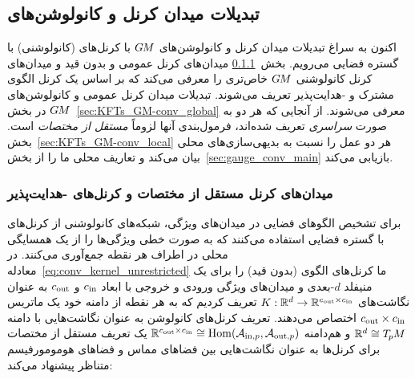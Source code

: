 

\subsection{تبدیلات میدان کرنل و کانولوشن‌های }
\label{sec:global_conv}

اکنون به سراغ تبدیلات میدان کرنل و کانولوشن‌های $G\mkern-1.4muM$ با کرنل‌های (کانولوشنی) با گستره فضایی می‌رویم.
بخش~\ref{sec:kernel_fields} میدان‌های کرنل عمومی و بدون قید و میدان‌های کرنل کانولوشنی $G\mkern-1.4muM$ خاص‌تری را معرفی می‌کند که بر اساس یک کرنل الگوی مشترک و -هدایت‌پذیر تعریف می‌شوند.
تبدیلات میدان کرنل عمومی و کانولوشن‌های $G\mkern-1.4muM$ در بخش~\ref{sec:KFTs_GM-conv_global} معرفی می‌شوند.
از آنجایی که هر دو به صورت \emph{سراسری} تعریف شده‌اند، فرمول‌بندی آنها لزوماً \emph{مستقل از مختصات} است.
بخش~\ref{sec:KFTs_GM-conv_local} هر دو عمل را نسبت به بدیهی‌سازی‌های محلی بیان می‌کند و تعاریف محلی ما را از بخش~\ref{sec:gauge_conv_main} بازیابی می‌کند.





\subsubsection[میدان‌های کرنل]{میدان‌های کرنل مستقل از مختصات و کرنل‌های -هدایت‌پذیر}
\label{sec:kernel_fields}

برای تشخیص الگوهای فضایی در میدان‌های ویژگی، شبکه‌های کانولوشنی از کرنل‌های با گستره فضایی استفاده می‌کنند که به صورت خطی ویژگی‌ها را از یک همسایگی محلی در اطراف هر نقطه جمع‌آوری می‌کنند.
در معادله~\eqref{eq:conv_kernel_unrestricted} ما کرنل‌های الگوی (بدون قید) را برای یک منیفلد $d$-بعدی و میدان‌های ویژگی ورودی و خروجی با ابعاد ${c_\textup{in}}$ و ${c_\textup{out}}$ به عنوان نگاشت‌های
$K: \mathbb{R}^d \to \mathbb{R}^{{c_\textup{out}}\times{c_\textup{in}}}$
تعریف کردیم که به هر نقطه از دامنه خود یک ماتریس ${c_\textup{out}}\times{c_\textup{in}}$ اختصاص می‌دهند.
تعریف کرنل‌های کانولوشن به عنوان نگاشت‌هایی با دامنه $\mathbb{R}^d\cong T_{\mkern-1.5mu p}\mkern-.5muM$ و هم‌دامنه $\mathbb{R}^{{c_\textup{out}}\times{c_\textup{in}}}\cong \operatorname{Hom}(\mathcal{A}_{\textup{in},p},\mathcal{A}_{\textup{out},p})$ یک تعریف مستقل از مختصات برای کرنل‌ها
به عنوان نگاشت‌هایی بین فضاهای مماس و فضاهای هومومورفیسم متناظر پیشنهاد می‌کند:


